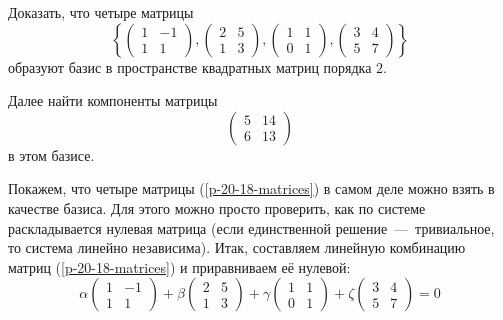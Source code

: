 \documentclass[a4paper,12pt]{article}
\begin{document}
  Доказать, что четыре матрицы
  \begin{equation}\label{p-20-18-matrices}
    \left\{
      \begin{pmatrix}
        1 & -1\\
        1 & 1
      \end{pmatrix},
      \begin{pmatrix}
        2 & 5\\
        1 & 3
      \end{pmatrix},
      \begin{pmatrix}
        1 & 1\\
        0 & 1
      \end{pmatrix},
      \begin{pmatrix}
        3 & 4\\
        5 & 7
      \end{pmatrix}
    \right\}
  \end{equation}
  образуют базис в пространстве квадратных матриц порядка $2$.
  
  Далее найти компоненты матрицы
  \[
    \begin{pmatrix}
      5 & 14\\
      6 & 13
    \end{pmatrix}
  \]
  в этом базисе.
  
  \begin{solution}
    Покажем, что четыре матрицы (\ref{p-20-18-matrices}) в самом деле можно взять в качестве базиса.
    Для этого можно просто проверить, как по системе раскладывается нулевая матрица (если единственной решение~---~тривиальное, то система линейно независима).
    Итак, составляем линейную комбинацию матриц (\ref{p-20-18-matrices}) и приравниваем её нулевой:
    \[
      \alpha \begin{pmatrix}
        1 & -1\\
        1 & 1
      \end{pmatrix} + \beta \begin{pmatrix}
        2 & 5\\
        1 & 3
      \end{pmatrix} + \gamma \begin{pmatrix}
        1 & 1\\
        0 & 1
      \end{pmatrix} + \zeta \begin{pmatrix}
        3 & 4\\
        5 & 7
      \end{pmatrix} = 0
    \]
  \end{solution}
  
\end{document}

